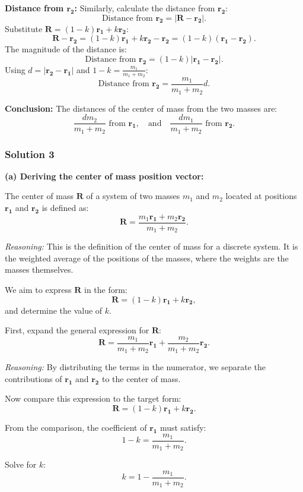 \documentclass{article}
\begin{document}
\textbf{Distance from $\mathbf{r_2}$:}
Similarly, calculate the distance from $\mathbf{r_2}$:
\[
\text{Distance from } \mathbf{r_2} = |\mathbf{R} - \mathbf{r_2}|.
\]
Substitute $\mathbf{R} = (1 - k)\mathbf{r_1} + k\mathbf{r_2}$:
\[
\mathbf{R} - \mathbf{r_2} = (1 - k)\mathbf{r_1} + k\mathbf{r_2} - \mathbf{r_2} = (1 - k)(\mathbf{r_1} - \mathbf{r_2}).
\]
The magnitude of the distance is:
\[
\text{Distance from } \mathbf{r_2} = (1 - k)|\mathbf{r_1} - \mathbf{r_2}|.
\]
Using $d = |\mathbf{r_2} - \mathbf{r_1}|$ and $1 - k = \frac{m_1}{m_1 + m_2}$:
\[
\text{Distance from } \mathbf{r_2} = \frac{m_1}{m_1 + m_2} d.
\]

\textbf{Conclusion:} The distances of the center of mass from the two masses are:
\[
\frac{dm_2}{m_1 + m_2} \text{ from } \mathbf{r_1}, \quad \text{and} \quad \frac{dm_1}{m_1 + m_2} \text{ from } \mathbf{r_2}.
\]

\subsubsection{Solution 3}
\textbf{(a) Deriving the center of mass position vector:}

The center of mass $\mathbf{R}$ of a system of two masses $m_1$ and $m_2$ located at positions $\mathbf{r_1}$ and $\mathbf{r_2}$ is defined as:
\[
\mathbf{R} = \frac{m_1 \mathbf{r_1} + m_2 \mathbf{r_2}}{m_1 + m_2}.
\]

\textit{Reasoning:} This is the definition of the center of mass for a discrete system. It is the weighted average of the positions of the masses, where the weights are the masses themselves.

We aim to express $\mathbf{R}$ in the form:
\[
\mathbf{R} = (1 - k)\mathbf{r_1} + k\mathbf{r_2},
\]
and determine the value of $k$.

First, expand the general expression for $\mathbf{R}$:
\[
\mathbf{R} = \frac{m_1}{m_1 + m_2} \mathbf{r_1} + \frac{m_2}{m_1 + m_2} \mathbf{r_2}.
\]

\textit{Reasoning:} By distributing the terms in the numerator, we separate the contributions of $\mathbf{r_1}$ and $\mathbf{r_2}$ to the center of mass.

Now compare this expression to the target form:
\[
\mathbf{R} = (1 - k)\mathbf{r_1} + k\mathbf{r_2}.
\]

From the comparison, the coefficient of $\mathbf{r_1}$ must satisfy:
\[
1 - k = \frac{m_1}{m_1 + m_2}.
\]

Solve for $k$:
\[
k = 1 - \frac{m_1}{m_1 + m_2}.
\]
\end{document}
